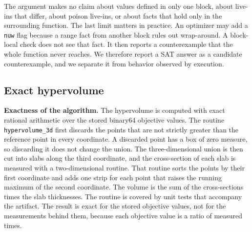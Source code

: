 The argument makes no claim about values defined in only one block, about live-ins that differ, about poison live-ins, or
about facts that hold only in the surrounding function. The last limit matters in practice. An optimizer may add a
\texttt{nuw} flag because a range fact from another block rules out wrap-around. A block-local check does not see that
fact. It then reports a counterexample that the whole function never reaches. We therefore report a SAT answer as a
candidate counterexample, and we separate it from behavior observed by execution.

\subsection{Exact hypervolume}

\textbf{Exactness of the algorithm.} The hypervolume is computed with exact rational arithmetic over the stored binary64
objective values. The routine \texttt{hypervolume\_\allowbreak{}3d} first discards the points that are not strictly greater than the
reference point in every coordinate. A discarded point has a box of zero measure, so discarding it does not change the
union. The three-dimensional union is then cut into slabs along the third coordinate, and the cross-section of each slab is
measured with a two-dimensional routine. That routine sorts the points by their first coordinate and adds one strip for each
point that raises the running maximum of the second coordinate. The volume is the sum of the cross-sections times the slab
thicknesses. The routine is covered by unit tests that accompany the artifact. The result is exact for the
stored objective values, not for the measurements behind them, because each objective value is a ratio of measured times.
